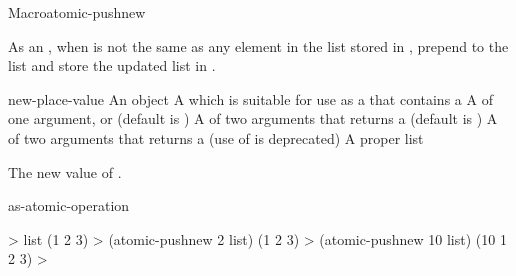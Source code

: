 \begin{functiondoc}{Macro}{atomic-pushnew}{ 
     
    \returns{} }
%

\fnsyntax

\fnpurpose As an , when  is not
the same as any element in the list stored in , prepend
 to the list and store the updated list in .

\fnpackage {}

\fnmodule {}

\fnargs
\begin{args}{new-place-value}
\arg[item] An object
\arg[place] A  which is suitable for use as a
 that contains a  
\arg[key] A  of one argument, or \nil{} (default is \nil)
\arg[test] A  of two arguments that returns a
 (default is ) 
 A  of two arguments that returns a
 (use of  is deprecated)
 A proper list
\end{args}

\fnreturns The new value of . 

\begin{alsos}{as-atomic-operation}
\end{alsos}

\fnexamples
%
\W\supp
\begin{example}
  > list
  (1 2 3)
  > (atomic-pushnew 2 list)
  (1 2 3)
  > (atomic-pushnew 10 list)
  (10 1 2 3)
  >
\end{example}

\end{functiondoc}


